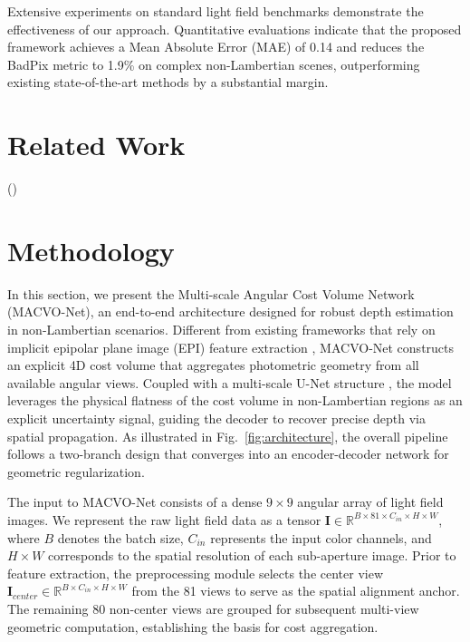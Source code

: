 \documentclass[lettersize,journal]{IEEEtran}
\begin{document}
Extensive experiments on standard light field benchmarks \cite{honauer2016} demonstrate the effectiveness of our approach. Quantitative evaluations indicate that the proposed framework achieves a Mean Absolute Error (MAE) of 0.14 and reduces the BadPix metric to 1.9\% on complex non-Lambertian scenes, outperforming existing state-of-the-art methods by a substantial margin.

\section{Related Work}

()

\section{Methodology}

In this section, we present the Multi-scale Angular Cost Volume Network (MACVO-Net), an end-to-end architecture designed for robust depth estimation in non-Lambertian scenarios. Different from existing frameworks that rely on implicit epipolar plane image (EPI) feature extraction \cite{wanner2014, heber2018}, MACVO-Net constructs an explicit 4D cost volume that aggregates photometric geometry from all available angular views. Coupled with a multi-scale U-Net structure \cite{ronneberger2015}, the model leverages the physical flatness of the cost volume in non-Lambertian regions as an explicit uncertainty signal, guiding the decoder to recover precise depth via spatial propagation. As illustrated in Fig.~\ref{fig:architecture}, the overall pipeline follows a two-branch design that converges into an encoder-decoder network for geometric regularization.

The input to MACVO-Net consists of a dense $9 \times 9$ angular array of light field images. We represent the raw light field data as a tensor $\mathbf{I} \in \mathbb{R}^{B \times 81 \times C_{in} \times H \times W}$, where $B$ denotes the batch size, $C_{in}$ represents the input color channels, and $H \times W$ corresponds to the spatial resolution of each sub-aperture image. Prior to feature extraction, the preprocessing module selects the center view $\mathbf{I}_{center} \in \mathbb{R}^{B \times C_{in} \times H \times W}$ from the 81 views to serve as the spatial alignment anchor. The remaining 80 non-center views are grouped for subsequent multi-view geometric computation, establishing the basis for cost aggregation.
\end{document}
